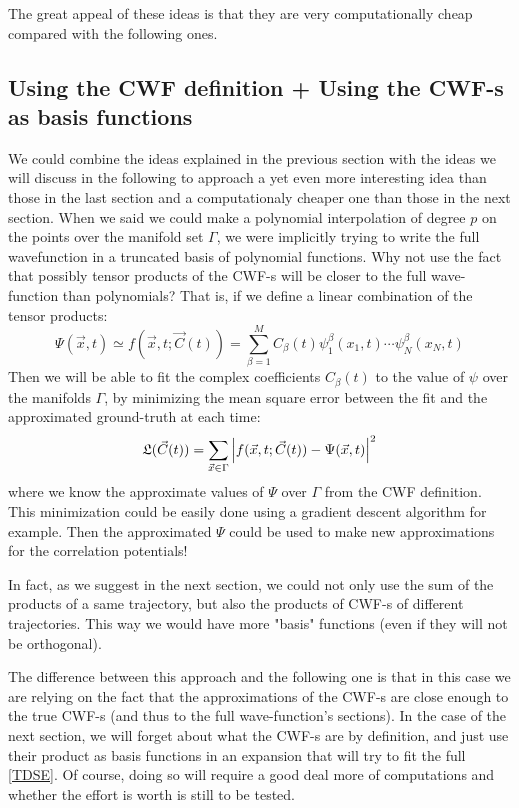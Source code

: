 \documentclass[11pt, a4paper]{article} %
\begin{document}
The great appeal of these ideas is that they are very computationally cheap compared with the following ones.\vspace{-0.15cm}

\subsection{Using the CWF definition + Using the CWF-s as basis functions}
\vspace{-0.2cm}

We could combine the ideas explained in the previous section with the ideas we will discuss in the following to approach a yet even more interesting idea than those in the last section and a computationaly cheaper one than those in the next section. When we said we could make a polynomial interpolation of degree $p$ on the points over the manifold set $\Gamma$, we were implicitly trying to write the full wavefunction in a truncated basis of polynomial functions. Why not use the fact that possibly tensor products of the CWF-s will be closer to the full wave-function than polynomials? That is, if we define a linear combination of the tensor products:
$$
\Psi(\vec{x},t)\simeq f(\vec{x},t;\vec{C}(t))= \sum_{\beta=1}^{M} C_\beta(t) \psi^\beta_1(x_1,t)\cdots \psi^\beta_N(x_N,t)
$$
Then we will be able to fit the complex coefficients $C_\beta(t)$ to the value of $\psi$ over the manifolds $\Gamma$, by minimizing the mean square error between the fit and the approximated ground-truth at each time:
$$
\mathfrak{L}(\vec{C}(t))=\sum_{\vec{x}\in \Gamma} \qty |f(\vec{x},t;\vec{C}(t))-\Psi(\vec{x},t)|^2
$$
where we know the approximate values of $\Psi$ over $\Gamma$ from the CWF definition. This minimization could be easily done using a gradient descent algorithm for example. Then the approximated $\Psi$ could be used to make new approximations for the correlation potentials!

In fact, as we suggest in the next section, we could not only use the sum of the products of a same trajectory, but also the products of CWF-s of different trajectories. This way we would have more "basis" functions (even if they will not be orthogonal).

The difference between this approach and the following one is that in this case we are relying on the fact that the approximations of the CWF-s are close enough to the true CWF-s (and thus to the full wave-function's sections). In the case of the next section, we will forget about what the CWF-s are by definition, and just use their product as basis functions in an expansion that will try to fit the full \ref{TDSE}. Of course, doing so will require a good deal more of computations and whether the effort is worth is still to be tested.\vspace{-0.2cm}
\end{document}
